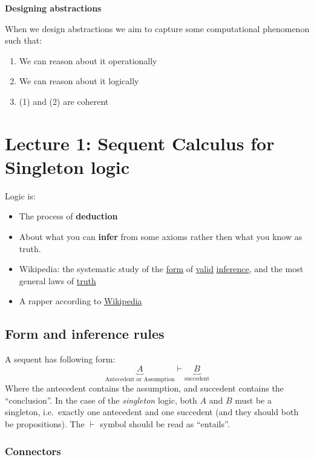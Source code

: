 \documentclass{article}
\begin{document}
\textbf{Designing abstractions}

When we design abstractions we aim to capture some computational
phenomenon such that:

\begin{enumerate}
	\item
	We can reason about it operationally
	\item
	We can reason about it logically
	\item (1) and (2) are coherent
\end{enumerate}

\section{Lecture 1: Sequent Calculus for Singleton logic}

Logic is:

\begin{itemize}
	\item
	The process of \textbf{deduction}
	\item
	About what you can \textbf{infer} from some axioms rather then what you know as truth.
	\item
	Wikipedia: the systematic study of the
	\href{https://en.wikipedia.org/wiki/Logical_form}{form} of
	\href{https://en.wikipedia.org/wiki/Validity_(logic)}{valid}
	\href{https://en.wikipedia.org/wiki/Inference}{inference}, and the
	most general laws of \href{https://en.wikipedia.org/wiki/Truth}{truth}
	\item
	A rapper according to
	\href{https://en.wikipedia.org/wiki/Logic_(musician)}{Wikipedia}
\end{itemize}

\subsection{Form and inference rules}


A sequent has following form: \[
\underbrace{A}_{\text{Antecedent or Assumption}} \vdash \underbrace{B}_{\text{succedent}}
\] Where the antecedent contains the assumption, and succedent contains
the ``conclusion''. In the case of the \emph{singleton} logic, both
\(A\) and \(B\) must be a singleton, i.e.~exactly one antecedent and one succedent (and they should both be propositions). The \(\vdash\) symbol should be read as ``entails''.

\subsubsection{Connectors}
\end{document}
